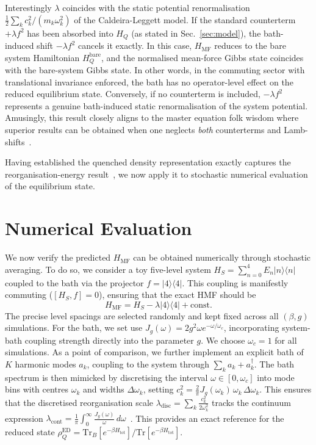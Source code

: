 \documentclass[aps,prl,twocolumn,superscriptaddress,showpacs,floatfix]{revtex4-2}
\newcommand{\Tr}{\mathrm{Tr}}
\begin{document}
Interestingly $\lambda$ coincides with the static potential renormalisation
$\frac{1}{2}\sum_k c_k^2/(m_k\omega_k^2)$ of the Caldeira-Leggett model. If the standard counterterm $+\lambda f^2$ has been absorbed into $H_Q$ (as stated in Sec.~\ref{sec:model}), the bath-induced shift $-\lambda f^2$ cancels it exactly. In this case, $H_{\mathrm{MF}}$ reduces to the bare system Hamiltonian $H_Q^{\mathrm{bare}}$, and the normalised mean-force Gibbs state coincides with the bare-system Gibbs state. In other words, in the commuting sector with translational invariance enforced, the bath has no operator-level effect on the reduced equilibrium
state. Conversely, if no counterterm is included, $-\lambda f^2$ represents a genuine
bath-induced static renormalisation of the system potential. Amusingly, this result closely aligns to the master equation folk wisdom where superior results can be obtained when one neglects \emph{both} counterterms and Lamb-shifts~\cite{correaPotentialRenormalisationLamb2025}.

Having established the quenched density representation exactly captures the reorganisation-energy result~\cite{campisiTalknerHanggi2009Solvable}, we now apply it to stochastic numerical evaluation of the equilibrium state.

 \section{Numerical Evaluation}
\label{sec:numerical}
We now verify the predicted $H_{\mathrm{MF}}$ can be obtained numerically through stochastic averaging. To do so, we consider a toy five-level system $H_S = \sum_{n=0}^4 E_n |n\rangle\langle n|$ coupled to the bath via the projector $f = |4\rangle\langle 4|$. This coupling is manifestly commuting ($[H_S, f] = 0$), ensuring that the exact HMF should be
\begin{equation}
    H_{\mathrm{MF}} = H_S - \lambda |4\rangle\langle 4| + \mathrm{const}.
\end{equation}
The precise level spacings are selected randomly and kept fixed across all $(\beta,g)$ simulations. For the bath, we set use $J_g(\omega)=2 g^2\omega e^{-\omega/\omega_c}$, incorporating system-bath coupling strength directly into the parameter $g$. We choose $\omega_c=1$ for all simulations. As a point of comparison, we further implement an explicit bath of $K$ harmonic modes $a_k$, coupling to the system through $\sum_k a_k +a_k^\dagger$. The bath spectrum is then mimicked by discretising the interval $\omega\in[0, \omega_c]$ into mode bins with centres $\omega_k$ and widths $\Delta\omega_k$, setting $c_k^2=\frac{2}{\pi}J_g(\omega_k)\,\omega_k\,\Delta\omega_k$. This ensures that the discretised reorganisation scale $\lambda_{\mathrm{disc}}=\sum_k\frac{c_k^2}{2\omega_k^2}$ tracks the continuum expression $\lambda_{\mathrm{cont}}=\frac{1}{\pi}\int_0^\infty\frac{J_g(\omega)}{\omega}\,d\omega$~\cite{weissQuantumDissipativeSystems2012}. This provides an exact reference for the reduced state $\rho_Q^{\mathrm{ED}}=\Tr_B[e^{-\beta H_{\mathrm{tot}}}]/\Tr[e^{-\beta H_{\mathrm{tot}}}]$. 
\end{document}
